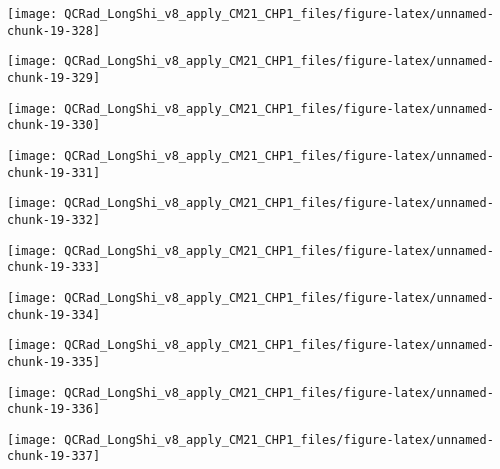 \documentclass[
  10pt,
  a4paper,oneside]{article}
\begin{document}
\begin{center}\texttt{[image: QCRad\_LongShi\_v8\_apply\_CM21\_CHP1\_files/figure-latex/unnamed-chunk-19-328]} \end{center}

\begin{center}\texttt{[image: QCRad\_LongShi\_v8\_apply\_CM21\_CHP1\_files/figure-latex/unnamed-chunk-19-329]} \end{center}

\begin{center}\texttt{[image: QCRad\_LongShi\_v8\_apply\_CM21\_CHP1\_files/figure-latex/unnamed-chunk-19-330]} \end{center}

\begin{center}\texttt{[image: QCRad\_LongShi\_v8\_apply\_CM21\_CHP1\_files/figure-latex/unnamed-chunk-19-331]} \end{center}

\begin{center}\texttt{[image: QCRad\_LongShi\_v8\_apply\_CM21\_CHP1\_files/figure-latex/unnamed-chunk-19-332]} \end{center}

\begin{center}\texttt{[image: QCRad\_LongShi\_v8\_apply\_CM21\_CHP1\_files/figure-latex/unnamed-chunk-19-333]} \end{center}

\begin{center}\texttt{[image: QCRad\_LongShi\_v8\_apply\_CM21\_CHP1\_files/figure-latex/unnamed-chunk-19-334]} \end{center}

\begin{center}\texttt{[image: QCRad\_LongShi\_v8\_apply\_CM21\_CHP1\_files/figure-latex/unnamed-chunk-19-335]} \end{center}

\begin{center}\texttt{[image: QCRad\_LongShi\_v8\_apply\_CM21\_CHP1\_files/figure-latex/unnamed-chunk-19-336]} \end{center}

\begin{center}\texttt{[image: QCRad\_LongShi\_v8\_apply\_CM21\_CHP1\_files/figure-latex/unnamed-chunk-19-337]} \end{center}
\end{document}
